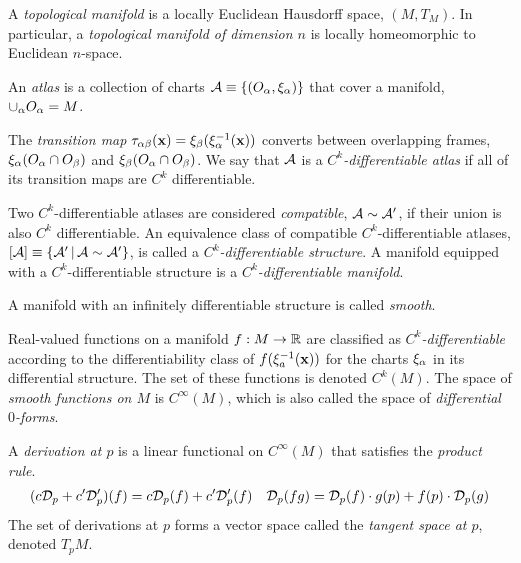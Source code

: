 \documentclass[11pt]{article}
\numberwithin{equation}{section}
\begin{document}
\begin{dfn}
A \textit{topological manifold} is a locally Euclidean Hausdorff space, $(M, T_M)$.
In particular, a \textit{topological manifold of dimension $n$} is locally homeomorphic to Euclidean $n$-space.
\end{dfn}

\begin{dfn}
An \textit{atlas} is a collection of charts $\mc{A}\equiv\{(O_\a, \xi_\a)\}$ that cover a manifold,
$
  \cup_{\alpha }
  O_{\alpha }
=
  M
$.
\end{dfn}

\begin{dfn}
The \textit{transition map}
$
  \ta_{\a\b}(\bo{x})
=
  \xi_\b(\xi_\a^{-1}(\bo{x}))
$
converts between overlapping frames,
$
  \xi_\a(O_\a\cap O_\b)
$
and
$
  \xi_\b(O_\a\cap O_\b)
$.
We say that $\mathcal{A}$ is a \textit{$C^k$-differentiable atlas} if all of its transition maps are $C^k$ differentiable.
\end{dfn}

\begin{dfn}
Two $C^k$-differentiable atlases are considered \textit{compatible}, $\mathcal{A}\sim\mathcal{A}'$, if their union is also $C^k$ differentiable.
An equivalence class of compatible $C^k$-differentiable atlases, $[\mathcal{A}]\equiv\{\mathcal{A}'\,|\,\mathcal{A}\sim\mathcal{A}'\}$, is called a \textit{$C^k$-differentiable structure}.
A manifold equipped with a $C^k$-differentiable structure is a \textit{$C^k$-differentiable manifold}.
\end{dfn}

\begin{dfn}
A manifold with an infinitely differentiable structure is called \textit{smooth}.
\end{dfn}

\begin{dfn}
Real-valued functions on a manifold $f:M\rightarrow\mathbb{R}$ are classified as \textit{$C^k$-differentiable} according to the differentiability class of $f(\xi_a^{-1}(\bo{x}))$ for the charts $\xi_\a$ in its differential structure.
The set of these functions is denoted $C^k(M)$.
The space of \textit{smooth functions on $M$} is $C^\infty(M)$, which is also called the space of \textit{differential $0$-forms}. 
\end{dfn}

\begin{dfn}
A \textit{derivation at $p$} is a linear functional on $C^\infty(M)$ that satisfies the \textit{product rule}.
\begin{align}
  (c\mathcal{D}_p + c'\mathcal{D}_p')(f)
=
  c\mathcal{D}_p(f)
+
  c'\mathcal{D}_p'(f)
&&
  \mathcal{D}_p(fg)
=
  \mathcal{D}_p(f)\cdot g(p)
+
  f(p) \cdot \mathcal{D}_p(g)
\end{align}
The set of derivations at $p$ forms a vector space called the \textit{tangent space at $p$}, denoted $T_pM$.
\end{dfn}
\end{document}
